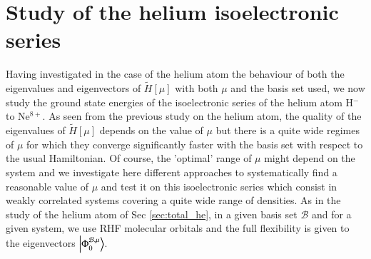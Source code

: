 \documentclass[aip,jcp,reprint,noshowkeys,superscriptaddress]{revtex4-1}
\newcommand{\phimub}[0]{\Phi^{\mathcal{B},\mu}_0}
\newcommand{\basis}[0]{\mathcal{B}}
\begin{document}
\section{Study of the helium isoelectronic series}
\label{sec:iso_elec}
Having investigated in the case of the helium atom the behaviour of both the eigenvalues and eigenvectors of $\tilde{H}[\mu]$ with both $\mu$ and the basis set used, we now study the ground state energies of the isoelectronic series of the helium atom H$^{-}$ to Ne$^{8+}$. As seen from the previous study on the helium atom, the quality of the eigenvalues of $\tilde{H}[\mu]$ depends on the value of $\mu$ but there is a quite wide regimes of $\mu$ for which they converge significantly faster with the basis set with respect to the usual Hamiltonian. Of course, the 'optimal' range of $\mu$ might depend on the system and we investigate here different approaches to systematically find a reasonable value of $\mu$ and test it on this isoelectronic series which consist in weakly correlated systems covering a quite wide range of densities. 
As in the study of the helium atom of Sec \ref{sec:total_he}, in a given basis set $\basis$ and for a given system, we use RHF molecular orbitals and the full flexibility is given to the eigenvectors $\ket{\phimub}$. 
\end{document}
